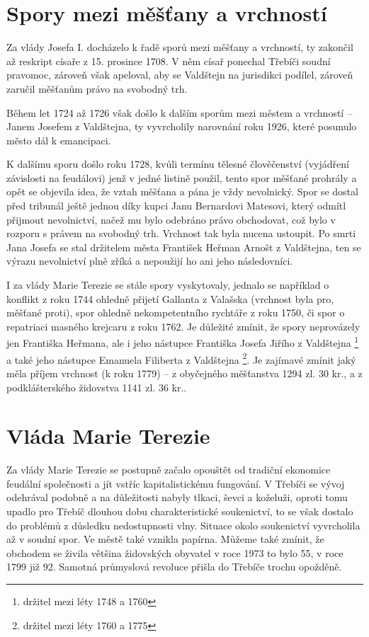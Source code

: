 \documentclass[a4paper,oneside,12p]{report}
\begin{document}
\section{Spory mezi měšťany a vrchností}

Za vlády Josefa I. docházelo k řadě sporů mezi měšťany a vrchností, ty zakončil až reskript císaře z 15. prosince 1708.
V něm císař ponechal Třebíči soudní pravomoc, zároveň však apeloval, aby se Valdštejn na jurisdikci podílel, zároveň zaručil měšťanům právo na svobodný trh. %

Během let 1724 až 1726 však došlo k dalším sporům mezi městem a vrchností -- Janem Josefem z Valdštejna, ty vyvrcholily narovnání roku 1926, které posunulo město dál k emancipaci. %

K dalšímu sporu došlo roku 1728, kvůli termínu tělesné člověčenství (vyjádření závislosti na feudálovi) jenž v jedné listině použil, tento spor měšťané prohrály a opět se objevila idea, že vztah měšťana a pána je vždy nevolnický.
Spor se dostal před tribunál ještě jednou díky kupci Janu Bernardovi Matesovi, který odmítl přijmout nevolnictví, načež mu bylo odebráno právo obchodovat, což bylo v rozporu s právem na svobodný trh.
Vrchnost tak byla nucena ustoupit.
Po smrti Jana Josefa se stal držitelem města František Heřman Arnošt z Valdštejna, ten se výrazu nevolnictví plně zříká a nepoužijí ho ani jeho následovníci. %

I za vlády Marie Terezie se stále spory vyskytovaly, jednalo se například o konflikt z roku 1744 ohledně přijetí Gallanta z Valašska (vrchnost byla pro, měšťané proti), spor ohledně nekompetentního rychtáře z roku 1750, či spor o repatriaci masného krejcaru z roku 1762.
Je důležité zmínit, že spory neprovázely jen Františka Heřmana, ale i jeho nástupce Františka Josefa Jiřího z Valdštejna \footnote{držitel mezi léty 1748 a 1760} a také jeho nástupce Emanuela Filiberta z Valdštejna \footnote{držitel mezi léty 1760 a 1775}.
Je zajímavé zmínit jaký měla příjem vrchnost (k roku 1779) -- z obyčejného měšťanstva 1294 zl. 30 kr., a z podklášterského židovstva 1141 zl. 36 kr.. %

\section{Vláda Marie Terezie}

Za vlády Marie Terezie se postupně začalo opouštět od tradiční ekonomice feudální společnosti a jít vstříc kapitalistickému fungování.
V Třebíči se vývoj odehrával podobně a na důležitosti nabyly tlkaci, ševci a koželuži, oproti tomu upadlo pro Třebíč dlouhou dobu charakteristické soukenictví, to se však dostalo do problémů z důsledku nedostupnosti vlny.
Situace okolo soukenictví vyvrcholila až v soudní spor.
Ve městě také vznikla papírna.
Můžeme také zmínit, že obchodem se živila většina židovských obyvatel v roce 1973 to bylo 55, v roce 1799 již 92.
Samotná průmyslová revoluce přišla do Třebíče trochu opožděně. %
\end{document}
